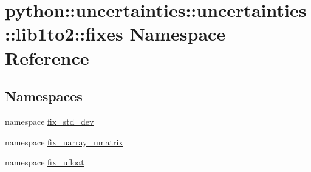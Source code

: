 \hypertarget{namespacepython_1_1uncertainties_1_1uncertainties_1_1lib1to2_1_1fixes}{
\section{python::uncertainties::uncertainties::lib1to2::fixes Namespace Reference}
\label{namespacepython_1_1uncertainties_1_1uncertainties_1_1lib1to2_1_1fixes}
}
\subsection*{Namespaces}
\begin{DoxyCompactItemize}
\item 
namespace \hyperlink{namespacepython_1_1uncertainties_1_1uncertainties_1_1lib1to2_1_1fixes_1_1fix__std__dev}{fix\_\-std\_\-dev}
\item 
namespace \hyperlink{namespacepython_1_1uncertainties_1_1uncertainties_1_1lib1to2_1_1fixes_1_1fix__uarray__umatrix}{fix\_\-uarray\_\-umatrix}
\item 
namespace \hyperlink{namespacepython_1_1uncertainties_1_1uncertainties_1_1lib1to2_1_1fixes_1_1fix__ufloat}{fix\_\-ufloat}
\end{DoxyCompactItemize}
